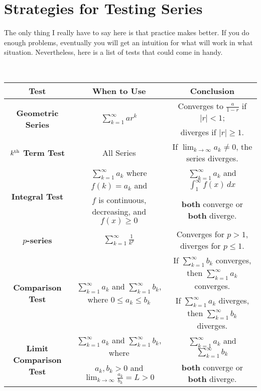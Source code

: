 \documentclass[letterpaper, twoside, 12pt]{book}
\theoremstyle{definition}
\theoremstyle{definition}
\begin{document}
\newpage

\section{Strategies for Testing Series}

The only thing I really have to say here is that practice makes better.  If you do enough problems, eventually you will get an intuition for what will work in what situation.  Nevertheless, here is a list of tests that could come in handy.

\

{\scriptsize \centering {}\begin{tabular}{|c|c|c|}
\hline
{\bf Test} & {\bf When to Use} & {\bf Conclusion} \\
\hline

\multirow{2}{*}{{\bf Geometric Series}} & \multirow{2}{*}{$\sum_{k=1}^{\infty} ar^k$} & Converges to $\frac{a}{1-r}$ if $|r| < 1$; \\ & &diverges if $|r| \geq 1$. \\
\hline

{\bf $k^{\rm{th}}$ Term Test} & All Series & If $\lim_{k \rightarrow \infty} a_k \neq 0$, the series diverges. \\
\hline

\multirow{2}{*}{{\bf Integral Test}} & $\sum_{k=1}^{\infty} a_k$ where $f(k) = a_k$ and & $\sum_{k = 1}^{\infty} a_k$ and $\int_1^\infty f(x) \, dx$ \\
&$f$ is continuous, decreasing, and $f(x) \geq 0$ & {\bf both} converge or {\bf both} diverge.\\
\hline

{\bf $p$-series} & $\sum_{k=1}^{\infty} \frac{1}{k^p}$ & Converges for $p > 1$, diverges for $p \leq 1$.\\
\hline

\multirow{2}{*}{{\bf Comparison Test}} & \multirow{2}{*}{$\sum_{k=1}^{\infty} a_k$ and $\sum_{k=1}^{\infty} b_k$, where $0 \leq a_k \leq b_k$} & If $\sum_{k=1}^{\infty} b_k$ converges, then $\sum_{k=1}^{\infty} a_k$ converges. \\ & & If $\sum_{k=1}^{\infty} a_k$ diverges, then $\sum_{k=1}^{\infty} b_k$ diverges.\\
\hline

\multirow{2}{*}{{\bf Limit Comparison Test}} & $\sum_{k=1}^{\infty} a_k$ and $\sum_{k=1}^{\infty} b_k$, where & $\sum_{k=1}^{\infty} a_k$ and $\sum_{k=1}^{\infty} b_k$ \\ & $a_k, b_k > 0$ and $\lim_{k\rightarrow \infty} \frac{a_k}{b_k} = L > 0$ & {\bf both} converge or {\bf both} diverge. \\
\hline


\end{tabular}}
\end{document}
